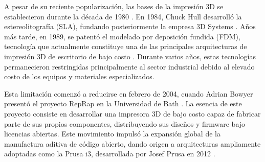 A pesar de su reciente popularización, las bases de la impresión 3D se establecieron durante la década de 1980 \cite{gibson2021,salazar2024}. En 1984, Chuck Hull desarrolló la estereolitografía (SLA), fundando posteriormente la empresa 3D Systems \cite{gibson2021}. Años más tarde, en 1989, se patentó el modelado por deposición fundida (FDM), tecnología que actualmente constituye una de las principales arquitecturas de impresión 3D de escritorio de bajo costo \cite{salazar2024}. Durante varios años, estas tecnologías permanecieron restringidas principalmente al sector industrial debido al elevado costo de los equipos y materiales especializados.

Esta limitación comenzó a reducirse en febrero de 2004, cuando Adrian Bowyer presentó el proyecto RepRap en la Universidad de Bath \cite{bowyer2004reprap}. La esencia de este proyecto consiste en desarrollar una impresora 3D de bajo costo capaz de fabricar parte de sus propios componentes, distribuyendo sus diseños y firmware bajo licencias abiertas. Este movimiento impulsó la expansión global de la manufactura aditiva de código abierto, dando origen a arquitecturas ampliamente adoptadas como la Prusa i3, desarrollada por Josef Prusa en 2012 \cite{prusa2012}.


